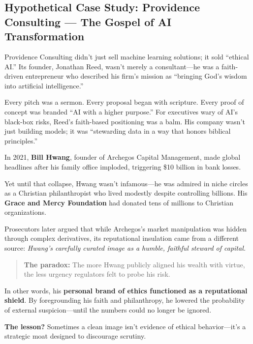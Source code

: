 \subsection{Hypothetical Case Study: Providence Consulting — The Gospel of AI Transformation}

Providence Consulting didn’t just sell machine learning solutions; it sold “ethical AI.” Its founder, Jonathan Reed, wasn’t merely a consultant—he was a faith-driven entrepreneur who described his firm’s mission as “bringing God’s wisdom into artificial intelligence.”


Every pitch was a sermon. Every proposal began with scripture. Every proof of concept was branded “AI with a higher purpose.” For executives wary of AI’s black-box risks, Reed’s faith-based positioning was a balm. His company wasn’t just building models; it was “stewarding data in a way that honors biblical principles.”

\begin{tcolorbox}[colback=blue!5!white, colframe=blue!50!black, breakable, title={Historical Sidebar: Bill Hwang, Archegos, and the Ethics Firewall}]
In 2021, \textbf{Bill Hwang}, founder of Archegos Capital Management, made global headlines after his family office imploded, triggering \$10 billion in bank losses.

\medskip

Yet until that collapse, Hwang wasn’t infamous—he was admired in niche circles as a Christian philanthropist who lived modestly despite controlling billions. His \textbf{Grace and Mercy Foundation} had donated tens of millions to Christian organizations.

\medskip

Prosecutors later argued that while Archegos’s market manipulation was hidden through complex derivatives, its reputational insulation came from a different source: \textit{Hwang’s carefully curated image as a humble, faithful steward of capital.}

\medskip

\begin{quote}
\textbf{The paradox:} The more Hwang publicly aligned his wealth with virtue, the less urgency regulators felt to probe his risk.
\end{quote}

\medskip

In other words, his \textbf{personal brand of ethics functioned as a reputational shield}. By foregrounding his faith and philanthropy, he lowered the probability of external suspicion—until the numbers could no longer be ignored.

\medskip

\textbf{The lesson?} Sometimes a clean image isn’t evidence of ethical behavior—it’s a strategic moat designed to discourage scrutiny.
\end{tcolorbox}

